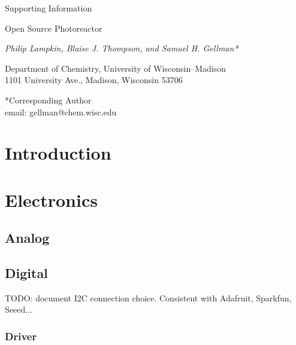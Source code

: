 \documentclass[11pt]{article}
\let\stdsection\section
\renewcommand\section{\clearpage\stdsection}
\begin{document}
\setcounter{page}{1}
\renewcommand{\thepage}{S\arabic{page}}

\begin{center}
	\LARGE

        Supporting Information

        Open Source Photoreactor

	\normalsize

	\textit{Philip Lampkin, Blaise J. Thompson, and Samuel H. Gellman*}

	Department of Chemistry, University of Wisconsin--Madison\\
	1101 University Ave., Madison, Wisconsin 53706
\end{center}

\vspace{\fill}

*Corresponding Author \\
\hspace*{2ex} email: gellman@chem.wisc.edu \\

\pagebreak
\renewcommand{\baselinestretch}{0.75}\normalsize
\tableofcontents
\renewcommand{\baselinestretch}{1.0}\normalsize
\pagebreak

\section{Introduction}

\section{Electronics}

\subsection{Analog}



\subsection{Digital}

TODO: document I2C connection choice.
Consistent with Adafruit, Sparkfun, Seeed...

\subsubsection{Driver}
\end{document}
